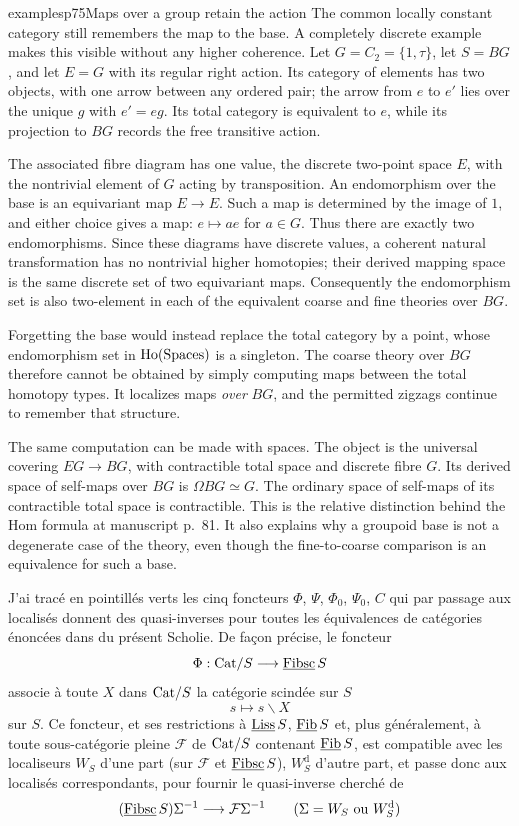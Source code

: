 \begin{dcomment}{examples}{p75}{Maps over a group retain the action}
The common locally constant category still remembers the map to the base. A completely discrete example makes this visible without any higher coherence. Let $G=C_2=\{1,\tau\}$, let $S=BG$, and let $E=G$ with its regular right action. Its category of elements has two objects, with one arrow between any ordered pair; the arrow from $e$ to $e'$ lies over the unique $g$ with $e'=eg$. Its total category is equivalent to $e$, while its projection to $BG$ records the free transitive action.

The associated fibre diagram has one value, the discrete two-point space $E$, with the nontrivial element of $G$ acting by transposition. An endomorphism over the base is an equivariant map $E\to E$. Such a map is determined by the image of $1$, and either choice gives a map: $e\mapsto ae$ for $a\in G$. Thus there are exactly two endomorphisms. Since these diagrams have discrete values, a coherent natural transformation has no nontrivial higher homotopies; their derived mapping space is the same discrete set of two equivariant maps. Consequently the endomorphism set is also two-element in each of the equivalent coarse and fine theories over $BG$.

Forgetting the base would instead replace the total category by a point, whose endomorphism set in $\mathrm{Ho}(\mathrm{Spaces})$ is a singleton. The coarse theory over $BG$ therefore cannot be obtained by simply computing maps between the total homotopy types. It localizes maps \emph{over} $BG$, and the permitted zigzags continue to remember that structure.

The same computation can be made with spaces. The object is the universal covering $EG\to BG$, with contractible total space and discrete fibre $G$. Its derived space of self-maps over $BG$ is $\Omega BG\simeq G$. The ordinary space of self-maps of its contractible total space is contractible. This is the relative distinction behind the Hom formula at manuscript p.~81. It also explains why a groupoid base is not a degenerate case of the theory, even though the fine-to-coarse comparison is an equivalence for such a base.
\end{dcomment}


J'ai tracé en pointillés verts les cinq foncteurs $\Phi$, $\Psi$, $\Phi_0$, $\Psi_0$, $C$ qui par passage aux localisés donnent des quasi-inverses pour toutes les équivalences de catégories énoncées dans   du présent Scholie. De façon précise, le foncteur
\[ \Phi : \mathrm{Cat}/S\longrightarrow\underline{\mathrm{Fibsc}}\,S \]
associe à toute $X$ dans $\mathrm{Cat}/S$ la catégorie scindée sur $S$
\[ s\longmapsto s\backslash X \]
sur $S$. Ce foncteur, et ses restrictions à $\underline{\mathrm{Liss}}\,S$, $\underline{\mathrm{Fib}}\,S$ et, plus généralement, à toute sous-catégorie pleine $\mathcal{F}$ de $\mathrm{Cat}/S$ contenant $\underline{\mathrm{Fib}}\,S$, est compatible avec les localiseurs $W_S$ d'une part (sur $\mathcal{F}$ et $\underline{\mathrm{Fibsc}}\,S$), $W_S^{\mathrm{d}}$ d'autre part, et passe donc aux localisés correspondants, pour fournir le quasi-inverse cherché de
\[ (\underline{\mathrm{Fibsc}}\,S)\Sigma^{-1}\longrightarrow\mathcal{F}\Sigma^{-1}\qquad(\Sigma=W_S\text{ ou }W_S^{\mathrm{d}}) \]


